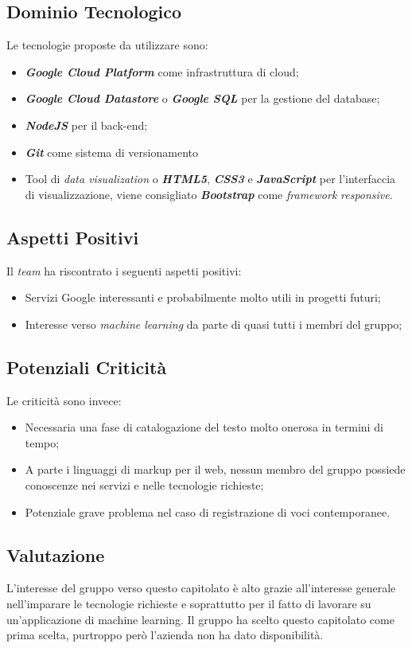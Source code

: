 \subsection{Dominio Tecnologico}
Le tecnologie proposte da utilizzare sono:
\begin{itemize}
	\item \textit{\textbf{Google Cloud Platform}} come infrastruttura di cloud;
	\item \textbf{\textit{Google Cloud Datastore}} o \textbf{\textit{Google SQL}} per la gestione del database;
	\item \textbf{\textit{NodeJS}} per il back-end;
	\item \textbf{\textit{Git}} come sistema di versionamento
	\item Tool di \textit{data visualization} o \textbf{\textit{HTML5}}, \textbf{\textit{CSS3}} e \textbf{\textit{JavaScript}} per l'interfaccia di visualizzazione, viene consigliato \textbf{\textit{Bootstrap}} come \textit{framework} \textit{responsive}.
\end{itemize}

\subsection{Aspetti Positivi}
Il \textit{team} ha riscontrato i seguenti aspetti positivi:
\begin{itemize}
	\item Servizi Google interessanti e probabilmente molto utili in progetti futuri;
	\item Interesse verso \textit{machine learning} da parte di quasi tutti i membri del gruppo;
\end{itemize}

\subsection{Potenziali Criticità}
Le criticità sono invece:
\begin{itemize}
	\item Necessaria una fase di catalogazione del testo molto onerosa in termini di tempo;
	\item A parte i linguaggi di markup per il web, nessun membro del gruppo possiede conoscenze nei servizi e nelle tecnologie richieste;
	\item Potenziale grave problema nel caso di registrazione di voci contemporanee.
\end{itemize}

\subsection{Valutazione}
L'interesse del gruppo verso questo capitolato è alto grazie all'interesse generale nell'imparare le tecnologie richieste e soprattutto per il fatto di lavorare su un'applicazione di machine learning.
Il gruppo ha scelto questo capitolato come prima scelta, purtroppo però l'azienda non ha dato disponibilità.